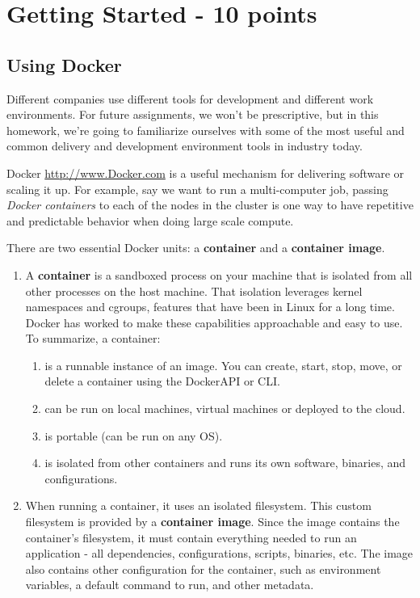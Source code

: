 \documentclass[paper=a4, fontsize=11pt]{scrartcl} %
\author{
    \textbf{YOUR NAME} \\ 
    \textbf{YOUR GIT USERNAME} \\ 
    \textbf{YOUR E-MAIL}
}%
\begin{document}
\maketitle %

\section{Getting Started - 10 points}
\subsection{Using Docker}


Different companies use different tools for development and different work environments. For future assignments, we won't be prescriptive, but in this homework, we're going to familiarize ourselves with some of the most useful and common delivery and development environment tools in industry today.

Docker \url{http://www.Docker.com} is a  useful mechanism for delivering software or scaling it up. For example, say we want to run a multi-computer job, passing \emph{Docker containers} to each of the nodes in the cluster is one way to have repetitive and predictable behavior when doing large scale compute.

There are two essential Docker units: a \textbf{container} and a \textbf{container image}.

\begin{enumerate}
    \item A \textbf{container} is a sandboxed process on your machine that is isolated from all other processes on the host machine. That isolation leverages kernel namespaces and cgroups, features that have been in Linux for a long time. Docker has worked to make these capabilities approachable and easy to use. To summarize, a container:
    \begin{enumerate}
        \item is a runnable instance of an image. You can create, start, stop, move, or delete a container using the DockerAPI or CLI. 
        \item can be run on local machines, virtual machines or deployed to the cloud.
        \item is portable (can be run on any OS).
        \item is isolated from other containers and runs its own software, binaries, and configurations.
    \end{enumerate}

    \item When running a container, it uses an isolated filesystem. This custom filesystem is provided by a \textbf{container image}. Since the image contains the container’s filesystem, it must contain everything needed to run an application - all dependencies, configurations, scripts, binaries, etc. The image also contains other configuration for the container, such as environment variables, a default command to run, and other metadata.
\end{enumerate}
\end{document}
